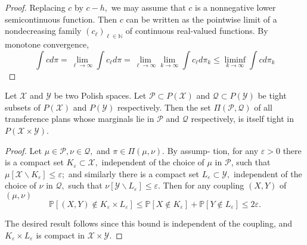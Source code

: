 \begin{proof}
 Replacing \( c \) by \( c - h , \) we may assume that \( c \) is a nonnegative lower semicontinuous function. Then \( c \) can be written as the pointwise limit of a nondecreasing family \( \left( c _ { \ell } \right) _ { \ell \in \mathbb { N } } \) of continuous real-valued functions. By monotone convergence,
	\[ \int c d \pi = \lim _ { \ell \rightarrow \infty } \int c _ { \ell } d \pi = \lim _ { \ell \rightarrow \infty } \lim _ { k \rightarrow \infty } \int c _ { \ell } d \pi _ { k } \leq \liminf _ { k \rightarrow \infty } \int c d \pi _ { k } \]
\end{proof}
\begin{lem}
	Let \( \mathcal { X } \) and \( \mathcal { Y } \) be two Polish spaces. Let \( \mathcal { P } \subset P ( \mathcal { X } ) \) and \( \mathcal { Q } \subset P ( \mathcal { Y } ) \) be tight subsets of \( P ( \mathcal { X } ) \) and \( P ( \mathcal { Y } ) \) respectively. Then the set \( \Pi ( \mathcal { P } , \mathcal { Q } ) \) of all transference plans whose marginals lie in \( \mathcal { P } \) and \( \mathcal { Q } \) respectively, is itself tight in \( P ( \mathcal { X } \times \mathcal { Y } ) \).
\end{lem}

\begin{proof}
 Let \( \mu \in \mathcal { P } , \nu \in \mathcal { Q } , \) and \( \pi \in \Pi ( \mu , \nu ) . \) By assump- tion, for any \( \varepsilon > 0 \) there is a compact set \( K _ { \varepsilon } \subset \mathcal { X } , \) independent of the choice of \( \mu \) in \( \mathcal { P } \), such that \( \mu \left[ \mathcal { X } \backslash K _ { \varepsilon } \right] \leq \varepsilon ; \) and similarly there is a compact set \( L _ { \varepsilon } \subset \mathcal { Y } , \) independent of the choice of \( \nu \) in \( \mathcal { Q } , \) such that \( \nu \left[ \mathcal { Y } \backslash L _ { \varepsilon } \right] \leq \varepsilon . \) Then for any coupling \( ( X , Y ) \) of \( ( \mu , \nu ) \)
	\[ \mathbb { P } \left[ ( X , Y ) \notin K _ { \varepsilon } \times L _ { \varepsilon } \right] \leq \mathbb { P } \left[ X \notin K _ { \varepsilon } \right] + \mathbb { P } \left[ Y \notin L _ { \varepsilon } \right] \leq 2 \varepsilon. \]

	The desired result follows since this bound is independent of the coupling, and \( K _ { \varepsilon } \times L _ { \varepsilon } \) is compact in \( \mathcal { X } \times \mathcal { Y }  \).
\end{proof}

